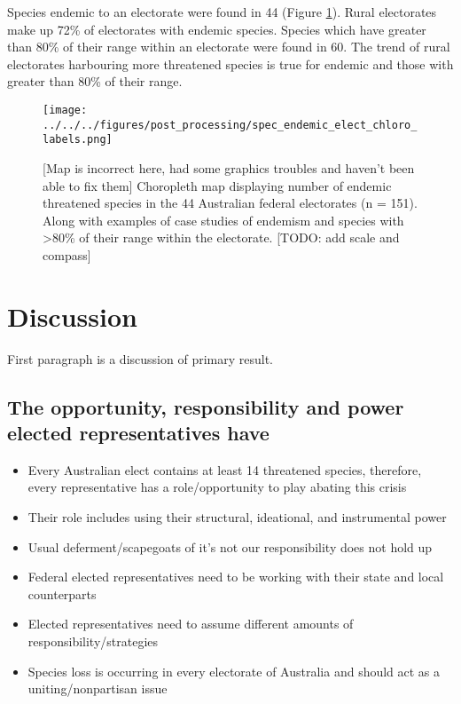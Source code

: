 \documentclass[a4paper,11pt]{article}
\begin{document}
Species endemic to an electorate were found in 44 (Figure \ref{fig:combined_chloro}). Rural electorates make up 72\% of electorates with endemic species.
Species which have greater than 80\% of their range within an electorate were found in 60. 
The trend of rural electorates harbouring more threatened species is true for endemic and those with greater than 80\% of their range.

\begin{figure}[H]
	\centering
    \texttt{[image: ../../../figures/post\_processing/spec\_endemic\_elect\_chloro\_labels.png]}
    \caption{[Map is incorrect here, had some graphics troubles and haven't been able to fix them] Choropleth map displaying number of endemic threatened species in the 44 Australian federal electorates (n = 151). Along with examples of case studies of endemism and species with >80\% of their range within the electorate. [TODO: add scale and compass]}
    \label{fig:combined_chloro}
\end{figure}

\section{Discussion}

First paragraph is a discussion of primary result.

\subsection{The opportunity, responsibility and power elected representatives have}

\begin{itemize}
    \item Every Australian elect contains at least 14 threatened species, therefore, every representative has a role/opportunity to play abating this crisis
    \item Their role includes using their structural, ideational, and instrumental power
    \item Usual deferment/scapegoats of it's not our responsibility does not hold up
    \item Federal elected representatives need to be working with their state and local counterparts
    \item Elected representatives need to assume different amounts of responsibility/strategies 
    \item Species loss is occurring in every electorate of Australia and should act as a uniting/nonpartisan issue
\end{itemize}
\end{document}
